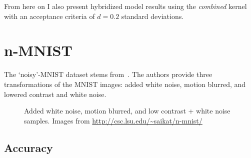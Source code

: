 \documentclass{article}
\begin{document}
From here on I also present hybridized model results using the \textit{combined} kernel with an acceptance criteria of $d=0.2$ standard deviations. 

\section{n-MNIST}

The `noisy'-MNIST dataset stems from~\citet{basu2017learning}. The authors provide three transformations of the MNIST images: added white noise, motion blurred, and lowered contrast and white noise.

\begin{figure}[htb]
\centering
{}
\centering
{}
\centering
{}

\caption{Added white noise, motion blurred, and low contrast + white noise samples. Images from \url{http://csc.lsu.edu/~saikat/n-mnist/}}
\end{figure}



\subsection{Accuracy}
\end{document}
